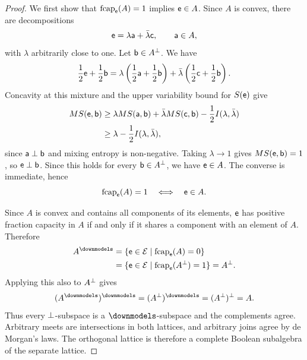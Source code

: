 \begin{mathSection}
\begin{proof}
		We first show that $\fcap_{\ens}(A)=1$ implies $\ens \in A$. Since $A$ is convex, there are decompositions
		\begin{equation}
			\ens = \lambda\ens[a]+\bar{\lambda}\ens[c],
			\qquad \ens[a] \in A,
		\end{equation}
		with $\lambda$ arbitrarily close to one. Let $\ens[b] \in A^{\ortho}$. We have
		\begin{equation}
			\frac{1}{2}\ens+\frac{1}{2}\ens[b]
			= \lambda\left(\frac{1}{2}\ens[a]+\frac{1}{2}\ens[b]\right)
			+\bar{\lambda}\left(\frac{1}{2}\ens[c]+\frac{1}{2}\ens[b]\right).
		\end{equation}
		Concavity at this mixture and the upper variability bound for $S(\ens)$ give
		\begin{equation}
			\begin{aligned}
				MS(\ens,\ens[b])
				&\geq \lambda MS(\ens[a],\ens[b])
				+\bar{\lambda}MS(\ens[c],\ens[b])
				-\frac{1}{2}I(\lambda,\bar{\lambda}) \\
				&\geq \lambda-\frac{1}{2}I(\lambda,\bar{\lambda}),
			\end{aligned}
		\end{equation}
		since $\ens[a] \ortho \ens[b]$ and mixing entropy is non-negative. Taking $\lambda \to 1$ gives $MS(\ens,\ens[b])=1$, so $\ens \ortho \ens[b]$. Since this holds for every $\ens[b] \in A^{\ortho}$, we have $\ens \in A$. The converse is immediate, hence
		\begin{equation}
			\fcap_{\ens}(A)=1
			\quad\Longleftrightarrow\quad
			\ens \in A.
		\end{equation}
		
		Since $A$ is convex and contains all components of its elements, $\ens$ has positive fraction capacity in $A$ if and only if it shares a component with an element of $A$. Therefore
		\begin{equation}
			\begin{aligned}
				A^{\separate}
				&= \{\ens \in \Ens \mid \fcap_{\ens}(A)=0\} \\
				&= \{\ens \in \Ens \mid \fcap_{\ens}(A^{\ortho})=1\}
				= A^{\ortho}.
			\end{aligned}
		\end{equation}
		Applying this also to $A^{\ortho}$ gives
		\begin{equation}
			(A^{\separate})^{\separate}
			= (A^{\ortho})^{\separate}
			= (A^{\ortho})^{\ortho}
			= A.
		\end{equation}
		Thus every $\ortho$-subspace is a $\separate$-subspace and the complements agree. Arbitrary meets are intersections in both lattices, and arbitrary joins agree by de Morgan's laws. The orthogonal lattice is therefore a complete Boolean subalgebra of the separate lattice.
	\end{proof}
\end{mathSection}

